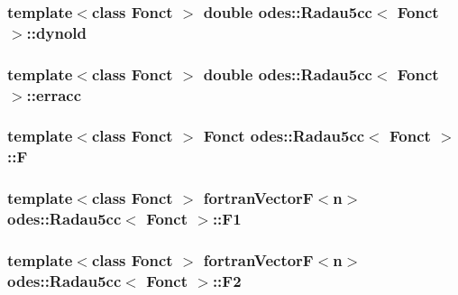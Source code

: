 \subsubsection[{dynold}]{\setlength{\rightskip}{0pt plus 5cm}template$<$class Fonct $>$ double {\bf odes\+::\+Radau5cc}$<$ Fonct $>$\+::dynold\hspace{0.3cm}{\ttfamily [private]}}\label{classodes_1_1Radau5cc_a5d60671c8cf94cc855a57a2afe201565}
\hypertarget{classodes_1_1Radau5cc_a54eb4159056970d5c2c3ea85e79154bb}{}
\subsubsection[{erracc}]{\setlength{\rightskip}{0pt plus 5cm}template$<$class Fonct $>$ double {\bf odes\+::\+Radau5cc}$<$ Fonct $>$\+::erracc\hspace{0.3cm}{\ttfamily [private]}}\label{classodes_1_1Radau5cc_a54eb4159056970d5c2c3ea85e79154bb}
\hypertarget{classodes_1_1Radau5cc_addca7bd0b74d75fd6f453969f6a619e2}{}
\subsubsection[{F}]{\setlength{\rightskip}{0pt plus 5cm}template$<$class Fonct $>$ Fonct {\bf odes\+::\+Radau5cc}$<$ Fonct $>$\+::F\hspace{0.3cm}{\ttfamily [protected]}}\label{classodes_1_1Radau5cc_addca7bd0b74d75fd6f453969f6a619e2}
\hypertarget{classodes_1_1Radau5cc_a7de9ff28e7bc72516e36010c8d2d65b9}{}
\subsubsection[{F1}]{\setlength{\rightskip}{0pt plus 5cm}template$<$class Fonct $>$ {\bf fortran\+Vector\+F}$<${\bf n}$>$ {\bf odes\+::\+Radau5cc}$<$ Fonct $>$\+::F1\hspace{0.3cm}{\ttfamily [protected]}}\label{classodes_1_1Radau5cc_a7de9ff28e7bc72516e36010c8d2d65b9}
\hypertarget{classodes_1_1Radau5cc_a7937b348a68aae3a31a1324a9c385bfa}{}
\subsubsection[{F2}]{\setlength{\rightskip}{0pt plus 5cm}template$<$class Fonct $>$ {\bf fortran\+Vector\+F}$<${\bf n}$>$ {\bf odes\+::\+Radau5cc}$<$ Fonct $>$\+::F2\hspace{0.3cm}{\ttfamily [protected]}}\label{classodes_1_1Radau5cc_a7937b348a68aae3a31a1324a9c385bfa}
\hypertarget{classodes_1_1Radau5cc_a1382307c537eb6d6747b1b68b9a977ff}{}
